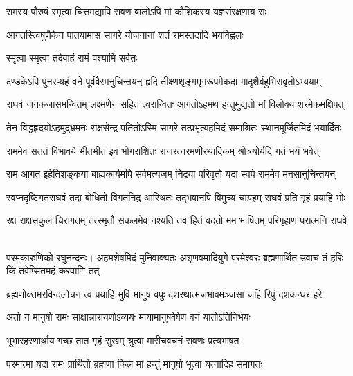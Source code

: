 \twolineshloka
{रामस्य पौरुषं स्मृत्वा चित्तमद्यापि रावण}
{बालोऽपि मां कौशिकस्य यज्ञसंरक्षणाय सः} %

\twolineshloka
{आगतस्त्विषुणैकेन पातयामास सागरे}
{योजनानां शतं रामस्तदादि भयविह्वलः} %

\onelineshloka
{स्मृत्वा स्मृत्वा तदेवाहं रामं पश्यामि सर्वतः} %


\fourlineindentedshloka
{दण्डकेऽपि पुनरप्यहं वने}
{पूर्ववैरमनुचिन्तयन् हृदि}
{तीक्ष्णशृङ्गमृगरूपमेकदा}
{मादृशैर्बहुभिरावृतोऽभ्ययाम्} %

\fourlineindentedshloka
{राघवं जनकजासमन्वितम्}
{लक्ष्मणेन सहितं त्वरान्वितः}
{आगतोऽहमथ हन्तुमुद्यतो}
{मां विलोक्य शरमेकमक्षिपत्} %

\fourlineindentedshloka
{तेन विद्धहृदयोऽहमुद्भ्रमनः}
{राक्षसेन्द्र पतितोऽस्मि सागरे}
{तत्प्रभृत्यहमिदं समाश्रितः}
{स्थानमूर्जितमिदं भयार्दितः} %

\fourlineindentedshloka
{राममेव सततं विभावये}
{भीतभीत इव भोगराशितः}
{राजरत्नरमणीरथादिकम्}
{श्रोत्रयोर्यदि गतं भयं भवेत्} %

\fourlineindentedshloka
{राम आगत इहेतिशङ्कया}
{बाह्यकार्यमपि सर्वमत्यजम्}
{निद्रया परिवृतो यदा स्वपे}
{राममेव मनसानुचिन्तयन्} %

\fourlineindentedshloka
{स्वप्नदृष्टिगतराघवं तदा}
{बोधितो विगतनिद्र आस्थितः}
{तद्भवानपि विमुच्य चाग्रहम्}
{राघवं प्रति गृहं प्रयाहि भोः} %

\fourlineindentedshloka
{रक्ष राक्षसकुलं चिरागतम्}
{तत्स्मृतौ सकलमेव नश्यति}
{तव हितं वदतो मम भाषितम्}
{परिगृहाण परात्मनि राघवे}%

\begin{minipage}{\linewidth}
\centering
\hspace{-8ex}{त्यज विरोधमतिं भज भक्तितः}\\
{परमकारुणिको रघुनन्दनः।} 
\fourlineindentedshloka
{अहमशेषमिदं मुनिवाक्यतः}
{अशृणवमादियुगे परमेश्वरः}
{ब्रह्मणार्थित उवाच तं हरिः}
{किं तवेप्सितमहं करवाणि तत्} %
\end{minipage}

\fourlineindentedshloka
{ब्रह्मणोक्तमरविन्दलोचन}
{त्वं प्रयाहि भुवि मानुषं वपुः}
{दशरथात्मजभावमञ्जसा}
{जहि रिपुं दशकन्धरं हरे} %

\twolineshloka
{अतो न मानुषो रामः साक्षान्नारायणोऽव्ययः}
{मायामानुषवेषेण वनं यातोऽतिनिर्भयः} %

\twolineshloka
{भूभारहरणार्थाय गच्छ तात गृहं सुखम्}
{श्रुत्वा मारीचवचनं रावणः प्रत्यभाषत} %

\twolineshloka
{परमात्मा यदा रामः प्रार्थितो ब्रह्मणा किल}
{मां हन्तुं मानुषो भूत्वा यत्नादिह समागतः} %

